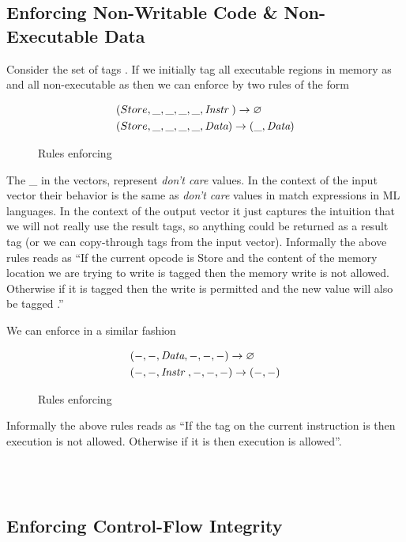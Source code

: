 \subsection{Enforcing Non-Writable Code \& Non-Executable Data}
\label{sec:nwc_nxd}

Consider the set of tags \TAGS{\DATA , \INSTRname}. If we initially tag
all executable regions in memory as \INSTR{} and all non-executable as \DATAname
then we can enforce \NWCname by two rules of the form

\begin{figure}[!htpb]
\begin{align*}
 & (Store, \_,\_, \_, \_,\textit{Instr}~) \rightarrow \varnothing \\
 & (Store, \_,\_, \_, \_,\textit{Data}) \rightarrow (\_, \textit{Data})
\end{align*}
\caption{Rules enforcing \NWC}
\end{figure}

The \_ in the vectors, represent \textit{don't care} values. In the context of
the input vector their behavior is the same as \textit{don't care} values in
match expressions in ML languages. In the context of the output vector it just
captures the intuition that we will not really use the result tags, so anything
could be returned as a result tag (\IE \DATAname or we can copy-through tags
from the input vector).
Informally the above rules reads as ``If the current opcode is Store and the
content of the memory location we are trying to write is tagged \INSTRname
then the memory write is not allowed. Otherwise if it is tagged \DATAname then
the write is permitted and the new value will also be tagged \DATA.''

We can enforce \NXDname in a similar fashion
\begin{figure}[!htpb]
\begin{align*}
 & (-, -,\textit{Data}, -, -, -) \rightarrow \varnothing \\
 & (-, -,\textit{Instr}~, -, -,-) \rightarrow (-, -)
\end{align*}
\caption{Rules enforcing \NXD}
\end{figure}

Informally the above rules reads as ``If the tag on the current instruction is
\DATAname then execution is not allowed. Otherwise if it is \INSTRname then
execution is allowed''.

\\
\\

\subsection{Enforcing Control-Flow Integrity}\label{sec:cfi_enforce}